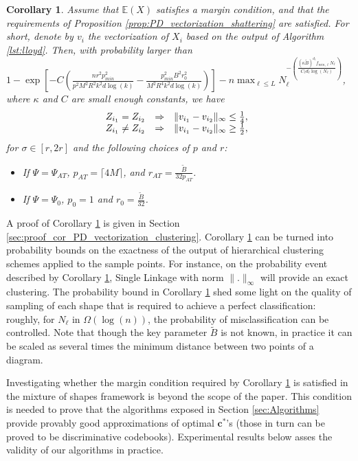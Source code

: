 \documentclass[noinfoline,preprint]{article}
\newtheorem{corollary}[theorem]{Corollary}
\newcommand{\cb}{\mathbf{c}}
\newcommand{\E}{\mathbb{E}}
\renewcommand{\1}{\mathds 1}
\begin{document}
\begin{corollary}\label{cor:PD_vectorization_clustering}
Assume that $\E(X)$ satisfies a margin condition, and that the requirements of Proposition \ref{prop:PD_vectorization_shattering} are satisfied. For short, denote by $v_i$ the vectorization of $X_i$ based on the output of Algorithm \ref{lst:lloyd}. Then, with probability larger than $1 - \exp{\left [-C\left ( \frac{n r^2 p_{min}^2}{p^2M^2R^2k^2 d \log(k)} - \frac{p_{min}^2 B^2 r_0^2}{M^2 R^4 k^2 d \log(k)} \right ) \right ]} - n \max_{\ell \leq L}N_\ell^{-\left ( \frac{(\kappa \tilde{B})^{d_\ell} f_{min,\ell} N_\ell}{C_\ell d_\ell \log(N_\ell)}\right)} $, where $\kappa$ and $C$ are small enough constants, we have
\[
\begin{array}{@{}ccc}
Z_{i_1}=Z_{i_2} & \Rightarrow & \| v_{i_1} - v_{i_2} \|_\infty \leq \frac{1}{4}, \\
Z_{i_1} \neq Z_{i_2} & \Rightarrow & \| v_{i_1} - v_{i_2} \|_\infty \geq \frac{1}{2},
\end{array}
\]
for $\sigma \in [r,2r]$ and the following choices of $p$ and $r$:
\begin{itemize}
\item If $\Psi = \Psi_{AT}$, $p_{AT} = \lceil 4M  \rceil$, and $r_{AT} = \frac{\tilde{B}}{32 p_{AT}}$.
\item If $\Psi = \Psi_0$, $p_0=1$ and $r_0 = \frac{\tilde{B}}{32}$.
\end{itemize}
\end{corollary}
A proof of Corollary \ref{cor:PD_vectorization_clustering} is given in Section \ref{sec:proof_cor_PD_vectorization_clustering}. Corollary \ref{cor:PD_vectorization_clustering} can be turned into probability bounds on the exactness of the output of hierarchical clustering schemes applied to the sample points. For instance, on the probability event described by Corollary \ref{cor:PD_vectorization_clustering}, Single Linkage with norm $\|.\|_\infty$ will provide an exact clustering. The probability bound in Corollary \ref{cor:PD_vectorization_clustering} shed some light on the quality of sampling of each shape that is required to achieve a perfect classification: roughly, for $N_\ell$ in $\Omega(\log(n))$, the probability of misclassification can be controlled. Note that though the key parameter $\tilde{B}$ is not known, in practice it can be scaled as several times the minimum distance between two points of a diagram.  

Investigating whether the margin condition required by Corollary \ref{cor:PD_vectorization_clustering} is satisfied in the mixture of shapes framework is beyond the scope of the paper. This condition is needed to prove that the algorithms exposed in Section \ref{sec:Algorithms} provide provably good approximations of optimal $\cb^*$'s (those in turn can be proved to be discriminative codebooks). Experimental results below asses the validity of our algorithms in practice.
\end{document}
